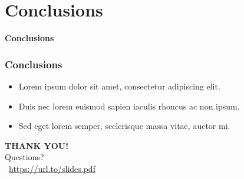 \documentclass[handout]{beamer}
\begin{document}

\section{Conclusions}

\begin{frame}
  \begin{center}
    \Huge
    \textbf{Conclusions}
  \end{center}
\end{frame}

\begin{frame}
  \frametitle{Conclusions}

  \begin{itemize}
    \item<1-> Lorem ipsum dolor sit amet, consectetur adipiscing elit.
    \item<2-> Duis nec lorem euismod sapien iaculis rhoncus ac non ipsum.
    \item<3-> Sed eget lorem semper, scelerisque massa vitae, auctor mi.
  \end{itemize}
\end{frame}

\begin{frame}[plain]{}
  \begin{center}
    \huge
    \textbf{THANK YOU!} \\
    Questions? \\
    \vspace{2.5em}
    \normalsize
    \faFilePowerpoint~\url{https://url.to/slides.pdf} \\
  \end{center}
\end{frame}
\end{document}
